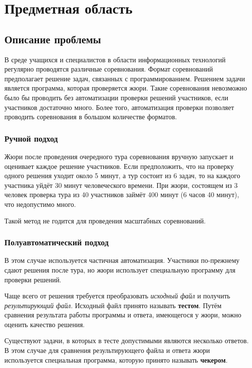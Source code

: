 \chapter{Предметная область}

\section{Описание проблемы}
В среде учащихся и специалистов в области информационных технологий
регулярно проводятся различные соревнования. Формат соревнований предполагает решение задач,
связанных с программированием. Решением задачи является программа, которая проверяется жюри.
Такие соревнования невозможно было бы проводить без автоматизации проверки решений участников,
если участников достаточно много. Более того, автоматизация проверки позволяет проводить соревнования
в большом количестве форматов.

\subsection{Ручной подход}
Жюри после проведения очередного тура соревнования
вручную запускает и оценивает каждое решение участников. Если предположить, что
на проверку одного решения уходит около 5 минут, а тур состоит из 6 задач, то на каждого
участника уйдёт 30 минут человеческого времени. При жюри, состоящем из 3 человек
проверка тура из 40 участников займёт 400 минут (6 часов 40 минут), что недопустимо много.

Такой метод не годится для проведения масштабных соревнований.

\subsection{Полуавтоматический подход}
В этом случае используется частичная автоматизация. Участники по-прежнему сдают решения
после тура, но жюри использует специальную программу для проверки решений.

Чаще всего от решения требуется преобразовать \textit{исходный файл} и получить \textit{результирующий файл}.
Исходный файл принято называть \textbf{тестом}. Путём сравнения результата работы программы
и ответа, имеющегося у жюри, можно оценить качество решения.

Существуют задачи, в которых в тесте допустимыми являются несколько ответов.
В этом случае для сравнения результирующего файла и ответа жюри используется
специальная программа, которую принято называть \textbf{чекером}.

